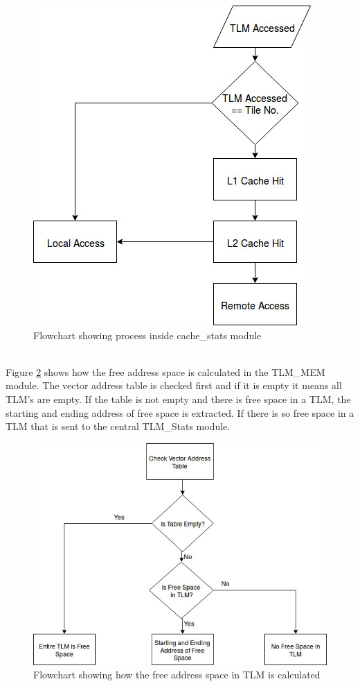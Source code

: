 \documentclass{listhesis}
\begin{document}
\begin{figure}
  \includegraphics[width=0.5\linewidth]{remoteLocalAccess.jpg}
  \centering
  \caption{Flowchart showing process inside cache{\_}stats module}
  \label{fig:remoteLocalAccess}
\end{figure}
\\
Figure \ref{fig:freeSpaceTLM} shows how the free address space is calculated in the TLM{\_}MEM module. The vector address table is checked first and if it is empty it means all TLM's are empty. If the table is not empty and there is free space in a TLM, the starting and ending address of free space is extracted. If there is so free space in a TLM that is sent to the central TLM{\_}Stats module. \\
\begin{figure}
  \includegraphics[width=0.7\linewidth]{freeSpaceTLM.jpg}
  \centering
  \caption{Flowchart showing how the free address space in TLM is calculated}
  \label{fig:freeSpaceTLM}
\end{figure}
\\
\end{document}

